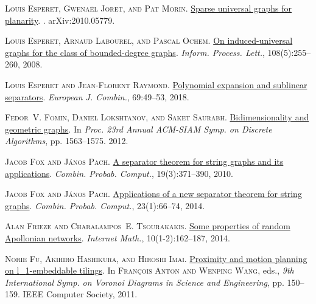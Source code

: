 \documentclass[a4paper,11pt]{article}
\theoremstyle{plain}
\theoremstyle{definition}
\begin{document}
\textsc{Louis Esperet, Gwena\"{e}l Joret, and Pat Morin}.
\newblock \href{http://arxiv.org/abs/2010.05779}{Sparse universal graphs for
  planarity}.
.
\newblock arXiv:2010.05779.

\textsc{Louis Esperet, Arnaud Labourel, and Pascal Ochem}.
\newblock \href{https://doi.org/10.1016/j.ipl.2008.04.020}{On induced-universal
  graphs for the class of bounded-degree graphs}.
\newblock \emph{Inform. Process. Lett.}, 108(5):255--260, 2008.

\textsc{Louis Esperet and Jean-Florent Raymond}.
\newblock \href{https://doi.org/10.1016/j.ejc.2017.09.003}{Polynomial expansion
  and sublinear separators}.
\newblock \emph{European J. Combin.}, 69:49--53, 2018.

\textsc{Fedor~V. Fomin, Daniel Lokshtanov, and Saket Saurabh}.
\newblock \href{https://doi.org/10.1137/1.9781611973099.124}{Bidimensionality
  and geometric graphs}.
\newblock In \emph{Proc. 23rd {A}nnual {ACM}-{SIAM} {S}ymp. on {D}iscrete
  {A}lgorithms}, pp. 1563--1575. 2012.

\textsc{Jacob Fox and J{\'a}nos Pach}.
\newblock \href{https://doi.org/10.1017/S0963548309990459}{A separator theorem
  for string graphs and its applications}.
\newblock \emph{Combin. Probab. Comput.}, 19(3):371--390, 2010.

\textsc{Jacob Fox and J{\'a}nos Pach}.
\newblock \href{https://doi.org/10.1017/S0963548313000412}{Applications of a
  new separator theorem for string graphs}.
\newblock \emph{Combin. Probab. Comput.}, 23(1):66--74, 2014.

\textsc{Alan Frieze and Charalampos~E. Tsourakakis}.
\newblock \href{https://doi.org/10.1080/15427951.2013.796300}{Some properties
  of random {A}pollonian networks}.
\newblock \emph{Internet Math.}, 10(1-2):162--187, 2014.

\textsc{Norie Fu, Akihiro Hashikura, and Hiroshi Imai}.
\newblock \href{https://doi.org/10.1109/ISVD.2011.28}{Proximity and motion
  planning on l{\_}1-embeddable tilings}.
\newblock In \textsc{Fran{\c{c}}ois Anton and Wenping Wang}, eds., \emph{9th
  International Symp. on Voronoi Diagrams in Science and Engineering}, pp.
  150--159. {IEEE} Computer Society, 2011.
\end{document}
